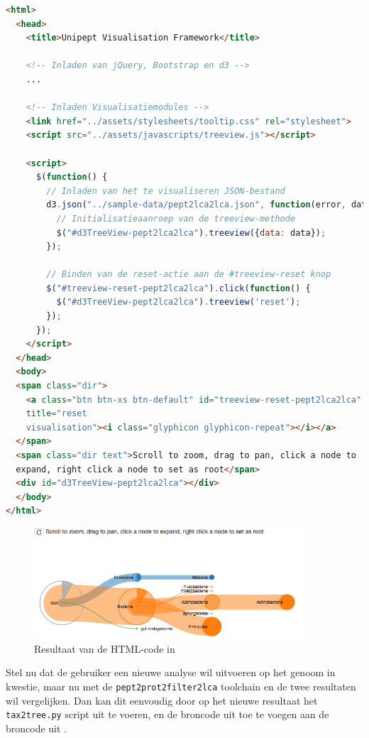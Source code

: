 \begin{lstlisting}[language=HTML,caption={Voorbeeldcode ter illustratie van 
modularisatie van de \texttt{treeview}-visualisatie},label={lst:visexample1}, 
float]
<html>
  <head>
    <title>Unipept Visualisation Framework</title>

    <!-- Inladen van jQuery, Bootstrap en d3 -->
    ...

    <!-- Inladen Visualisatiemodules -->
    <link href="../assets/stylesheets/tooltip.css" rel="stylesheet">
    <script src="../assets/javascripts/treeview.js"></script>

    <script>
      $(function() {
        // Inladen van het te visualiseren JSON-bestand
        d3.json("../sample-data/pept2lca2lca.json", function(error, data) {
          // Initialisatieaanroep van de treeview-methode
          $("#d3TreeView-pept2lca2lca").treeview({data: data});
        });
        
        // Binden van de reset-actie aan de #treeview-reset knop
        $("#treeview-reset-pept2lca2lca").click(function() {
          $("#d3TreeView-pept2lca2lca").treeview('reset');
        });
      });
    </script>
  </head>
  <body>
  <span class="dir">
    <a class="btn btn-xs btn-default" id="treeview-reset-pept2lca2lca" 
    title="reset 
    visualisation"><i class="glyphicon glyphicon-repeat"></i></a>
  </span>
  <span class="dir text">Scroll to zoom, drag to pan, click a node to 
  expand, right click a node to set as root</span>
  <div id="d3TreeView-pept2lca2lca"></div>
  </body>
</html>
\end{lstlisting}

\begin{figure}
    \centering
    \includegraphics[width=0.9\textwidth]{includes/visexample1}
    \caption{Resultaat van de HTML-code in }
    \label{fig:visexample1}
\end{figure}

Stel nu dat de gebruiker een nieuwe analyse wil uitvoeren op het genoom in 
kwestie,
maar nu met de \texttt{pept2prot2filter2lca} toolchain en de twee resultaten
wil vergelijken. Dan kan dit eenvoudig door op het nieuwe resultaat het
\texttt{tax2tree.py} script uit te voeren, en de broncode uit
 toe te voegen aan de broncode uit .

